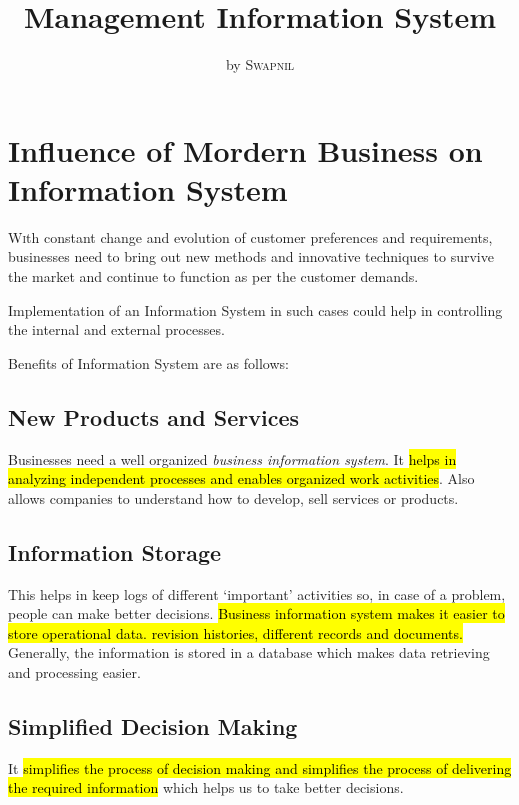 \documentclass[12pt, a4paper]{article}
\title{Management Information System}
\author{ by
  \textsc{Swapnil}%
}
\date{}
\begin{document}
  \maketitle

\section{Influence of Mordern Business on Information System}%
\lettrine[nindent=0em,lines=2]{W}ith constant change and evolution of customer
preferences and requirements, businesses need to bring out new methods and
innovative techniques to survive the market and continue to function as per
the customer demands.

Implementation of an Information System in such cases could help in
controlling the internal and external processes.

Benefits of Information System are as follows:

\subsection{New Products and Services}
Businesses need a well organized \emph{business information system}.
It \hl{helps in analyzing independent processes and enables organized work
activities}. Also allows companies to understand how to develop, sell
services or products.

\subsection{Information Storage}
This helps in keep logs of different `important' activities so, in case of
a problem, people can make better decisions. \hl{Business information
system makes it easier to store operational data. revision histories,
different records and documents.} Generally, the information is stored in a
database which makes data retrieving and processing easier.

\subsection{Simplified Decision Making}
It \hl{simplifies the process of decision making and simplifies the process
of delivering the required information} which helps us to take better
decisions.
\end{document}
